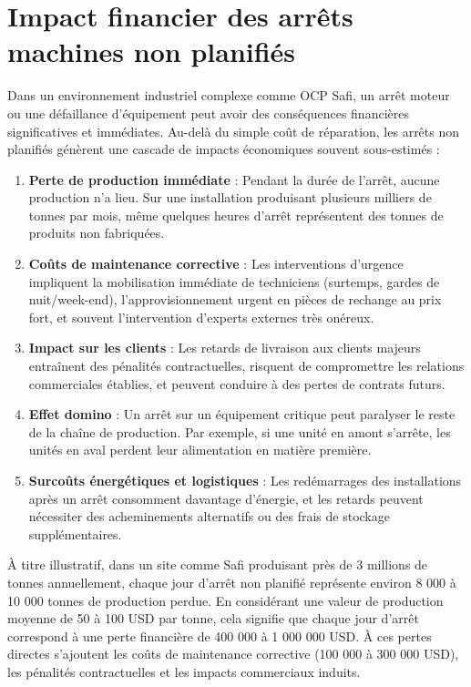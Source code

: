\documentclass[a4paper,12pt,twoside]{report}
\begin{document}
\section*{Impact financier des arrêts machines non planifiés}

Dans un environnement industriel complexe comme OCP Safi, un arrêt moteur ou une défaillance d'équipement peut avoir des conséquences financières significatives et immédiates. Au-delà du simple coût de réparation, les arrêts non planifiés génèrent une cascade de impacts économiques souvent sous-estimés :

\begin{enumerate}
    \item \textbf{Perte de production immédiate} : Pendant la durée de l'arrêt, aucune production n'a lieu. Sur une installation produisant plusieurs milliers de tonnes par mois, même quelques heures d'arrêt représentent des tonnes de produits non fabriquées.
    
    \item \textbf{Coûts de maintenance corrective} : Les interventions d'urgence impliquent la mobilisation immédiate de techniciens (surtemps, gardes de nuit/week-end), l'approvisionnement urgent en pièces de rechange au prix fort, et souvent l'intervention d'experts externes très onéreux.
    
    \item \textbf{Impact sur les clients} : Les retards de livraison aux clients majeurs entraînent des pénalités contractuelles, risquent de compromettre les relations commerciales établies, et peuvent conduire à des pertes de contrats futurs.
    
    \item \textbf{Effet domino} : Un arrêt sur un équipement critique peut paralyser le reste de la chaîne de production. Par exemple, si une unité en amont s'arrête, les unités en aval perdent leur alimentation en matière première.
    
    \item \textbf{Surcoûts énergétiques et logistiques} : Les redémarrages des installations après un arrêt consomment davantage d'énergie, et les retards peuvent nécessiter des acheminements alternatifs ou des frais de stockage supplémentaires.
\end{enumerate}

À titre illustratif, dans un site comme Safi produisant près de 3 millions de tonnes annuellement, chaque jour d'arrêt non planifié représente environ 8 000 à 10 000 tonnes de production perdue. En considérant une valeur de production moyenne de 50 à 100 USD par tonne, cela signifie que chaque jour d'arrêt correspond à une perte financière de 400 000 à 1 000 000 USD. À ces pertes directes s'ajoutent les coûts de maintenance corrective (100 000 à 300 000 USD), les pénalités contractuelles et les impacts commerciaux induits.
\end{document}
